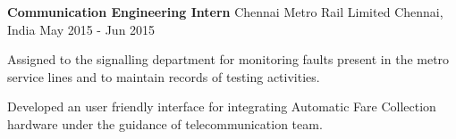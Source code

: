 \begin{cventries}
  \cventry
    {\textbf{Communication Engineering Intern}} %
    {Chennai Metro Rail Limited} %
    {Chennai, India} %
    { May 2015 - Jun 2015} %
    {
      \begin{cvitems} %
        \normalsize{\item {Assigned to the signalling department for monitoring faults present in the metro service lines and to maintain records of testing activities.}
        \item {Developed an user friendly interface for integrating Automatic Fare Collection hardware under the guidance of telecommunication team.}}
      \end{cvitems}
    }
\end{cventries}
